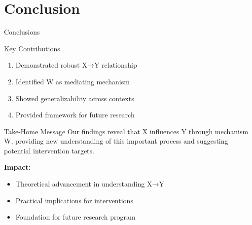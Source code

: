 \documentclass[aspectratio=169,11pt]{beamer}
\begin{document}

\section{Conclusion}

\begin{frame}{Conclusions}
  \begin{exampleblock}{Key Contributions}
    \begin{enumerate}
      \item Demonstrated robust X→Y relationship
      \item Identified W as mediating mechanism
      \item Showed generalizability across contexts
      \item Provided framework for future research
    \end{enumerate}
  \end{exampleblock}

  \vspace{0.5cm}

  \begin{block}{Take-Home Message}
    Our findings reveal that X influences Y through mechanism W, providing new understanding of this important process and suggesting potential intervention targets.
  \end{block}

  \vspace{0.5cm}

  \textbf{Impact:}
  \begin{itemize}
    \item Theoretical advancement in understanding X→Y
    \item Practical implications for interventions
    \item Foundation for future research program
  \end{itemize}
\end{frame}
\end{document}
